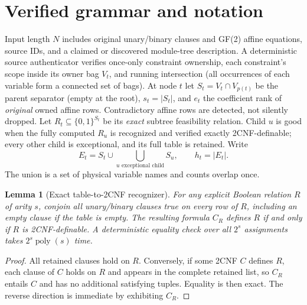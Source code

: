 \documentclass[11pt]{article}
\newtheorem{lemma}[theorem]{Lemma}
\begin{document}
\section{Verified grammar and notation}
Input length $N$ includes original unary/binary clauses and GF(2) affine equations, source IDs, and a claimed or discovered module-tree description. A deterministic source authenticator verifies once-only constraint ownership, each constraint's scope inside its owner bag $V_t$, and running intersection (all occurrences of each variable form a connected set of bags). At node $t$ let $S_t=V_t\cap V_{p(t)}$ be the parent separator (empty at the root), $s_t=|S_t|$, and $e_t$ the coefficient rank of \emph{original} owned affine rows. Contradictory affine rows are detected, not silently dropped. Let $R_t\subseteq\{0,1\}^{S_t}$ be its \emph{exact} subtree feasibility relation. Child $u$ is good when the fully computed $R_u$ is recognized and verified exactly 2CNF-definable; every other child is exceptional, and its full table is retained. Write
\[
 E_t=S_t\cup\bigcup_{u\text{ exceptional child}}S_u,
 \qquad h_t=|E_t|.
\]
The union is a set of physical variable names and counts overlap once.

\begin{lemma}[Exact table-to-2CNF recognizer]
For any explicit Boolean relation $R$ of arity $s$, conjoin all unary/binary clauses true on every row of $R$, including an empty clause if the table is empty. The resulting formula $C_R$ defines $R$ if and only if $R$ is 2CNF-definable. A deterministic equality check over all $2^s$ assignments takes $2^s\operatorname{poly}(s)$ time.
\end{lemma}
\begin{proof}
All retained clauses hold on $R$. Conversely, if some 2CNF $C$ defines $R$, each clause of $C$ holds on $R$ and appears in the complete retained list, so $C_R$ entails $C$ and has no additional satisfying tuples. Equality is then exact. The reverse direction is immediate by exhibiting $C_R$.
\end{proof}
\end{document}
